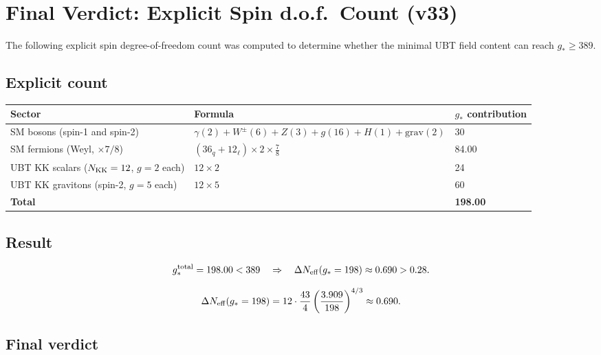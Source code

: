 \documentclass[12pt,a4paper]{article}
\begin{document}
\section{Final Verdict: Explicit Spin d.o.f.\ Count (v33)}
\label{sec:final_verdict}
\label{sec:verdict}

The following explicit spin degree-of-freedom count was computed to determine
whether the minimal UBT field content can reach $g_*\ge 389$.

\subsection{Explicit count}

\begin{center}
\begin{tabular}{lll}
\toprule
Sector & Formula & $g_*$ contribution \\
\midrule
SM bosons (spin-1 and spin-2) & $\gamma(2)+W^{\pm}(6)+Z(3)+g(16)+H(1)+\mathrm{grav}(2)$ & 30 \\
SM fermions (Weyl, $\times7/8$) & $(36_q+12_\ell)\times2\times\tfrac{7}{8}$ & 84.00 \\
UBT KK scalars ($N_{\rm KK}=12$, $g=2$ each) & $12\times 2$ & 24 \\
UBT KK gravitons (spin-2, $g=5$ each) & $12\times 5$ & 60 \\
\midrule
\textbf{Total} & & \textbf{198.00} \\
\bottomrule
\end{tabular}
\end{center}

\subsection{Result}

\[
  g_*^{\rm total} = 198.00 < 389 \quad \Rightarrow \quad
  \Delta N_{\rm eff}(g_*=198) \approx 0.690 > 0.28.
\]

\begin{equation}
  \Delta N_{\rm eff}(g_*=198) = 12\cdot\frac{43}{4}
  \left(\frac{3.909}{198}\right)^{4/3} \approx 0.690.
\end{equation}

\subsection*{Final verdict}
\end{document}
